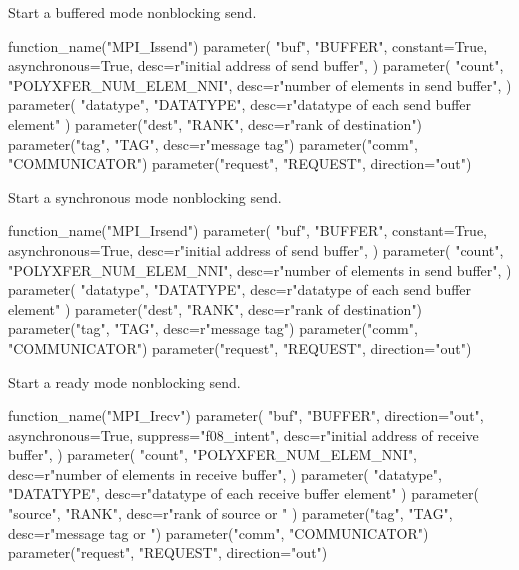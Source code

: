 Start a buffered mode nonblocking send.



\begin{mpi-binding}
    function_name("MPI_Issend")
    parameter(
        "buf",
        "BUFFER",
        constant=True,
        asynchronous=True,
        desc=r"initial address of send buffer",
    )
    parameter(
        "count",
        "POLYXFER_NUM_ELEM_NNI",
        desc=r"number of elements in send buffer",
    )
    parameter(
        "datatype", "DATATYPE", desc=r"datatype of each send buffer element"
    )
    parameter("dest", "RANK", desc=r"rank of destination")
    parameter("tag", "TAG", desc=r"message tag")
    parameter("comm", "COMMUNICATOR")
    parameter("request", "REQUEST", direction="out")
\end{mpi-binding}

Start a synchronous mode nonblocking send.

\begin{mpi-binding}
    function_name("MPI_Irsend")
    parameter(
        "buf",
        "BUFFER",
        constant=True,
        asynchronous=True,
        desc=r"initial address of send buffer",
    )
    parameter(
        "count",
        "POLYXFER_NUM_ELEM_NNI",
        desc=r"number of elements in send buffer",
    )
    parameter(
        "datatype", "DATATYPE", desc=r"datatype of each send buffer element"
    )
    parameter("dest", "RANK", desc=r"rank of destination")
    parameter("tag", "TAG", desc=r"message tag")
    parameter("comm", "COMMUNICATOR")
    parameter("request", "REQUEST", direction="out")
\end{mpi-binding}

Start a ready mode nonblocking send.


\begin{mpi-binding}
    function_name("MPI_Irecv")
    parameter(
        "buf",
        "BUFFER",
        direction="out",
        asynchronous=True,
        suppress="f08_intent",
        desc=r"initial address of receive buffer",
    )
    parameter(
        "count",
        "POLYXFER_NUM_ELEM_NNI",
        desc=r"number of elements in receive buffer",
    )
    parameter(
        "datatype", "DATATYPE", desc=r"datatype of each receive buffer element"
    )
    parameter(
        "source", "RANK", desc=r"rank of source or "
    )
    parameter("tag", "TAG", desc=r"message tag or ")
    parameter("comm", "COMMUNICATOR")
    parameter("request", "REQUEST", direction="out")
\end{mpi-binding}

